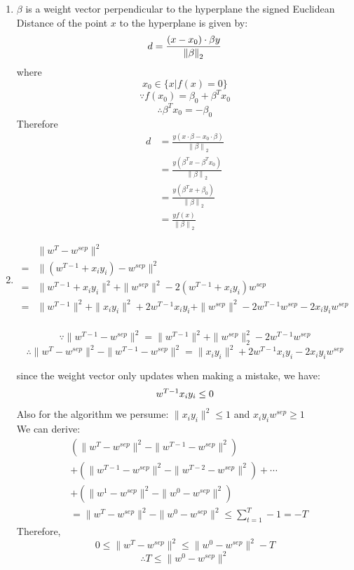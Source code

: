 \documentclass[11pt, oneside]{article}   	%
\begin{document}
\begin{enumerate}
\item %
  $\beta$ is a weight vector perpendicular to the hyperplane
  the signed Euclidean Distance of the point $x$ to the hyperplane is given by:
  \[
  d=\frac{(x-x_0) \cdot \beta y} {\left \| \beta \right \|_2}\\
  \]
  where
  \[
  x_0 \in \{x|f(x)=0\}
  \]
  \[
  \because f(x_0)=\beta_0 + \beta^Tx_0
  \]
  \[
  \therefore \beta^T x_0 = -\beta_0
  \]
  Therefore
  \begin{equation}
    \begin{split}
      d&=\frac{y(x \cdot \beta - x_0 \cdot \beta)} {\left \| \beta \right \|_2}\\
      &=\frac{y(\beta^T x - \beta^T x_0)} {\left \| \beta \right \|_2}\\
      &=\frac{y(\beta^T x + \beta_0)} {\left \| \beta \right \|_2}\\
      &=\frac{yf(x)} {\left \| \beta \right \|_2}
    \end{split}
  \end{equation}

\item %
  \begin{equation}
    \begin{split}
        & \| w^T - w^{sep} \|^2 \\
      = & \| (w^{T-1} + x_i y_i) - w^{sep} \|^2 \\
      = & \| w^{T-1} + x_i y_i \|^2  + \| w^{sep} \|^2 - 2 (w^{T-1} + x_i y_i) w^{sep} \\
      = & \|w^{T-1}\|^2 + \|x_i y_i\|^2 + 2 w^{T-1} x_i y_i + \| w^{sep} \|^2 - 2 w^{T-1} w^{sep} - 2 x_i y_i w^{sep}   \\
    \end{split}
  \end{equation}
  
  \[
  \because
  \| w^{T-1} - w^{sep} \|^2 = \|w^{T-1}\|^2 +  \| w^{sep} \|_2^2 - 2 w^{T-1} w^{sep}
  \]
  \[
  \therefore
  \| w^T - w^{sep} \|^2 - \| w^{T-1} - w^{sep} \|^2 = \|x_i y_i\|^2 + 2 w^{T-1} x_i y_i - 2 x_i y_i w^{sep}
  \]

since the weight vector only updates when making a mistake, we have:
\[
w^{T-1} x_i y_i \leq 0 \\
\]
Also for the algorithm we persume:
$ \|x_i y_i\|^2 \leq 1 $ and $ x_i y_i w^{sep} \geq 1 $\\
We can derive:
\begin{equation}
  \begin{split}
   & (\| w^T - w^{sep} \|^2 - \| w^{T-1} - w^{sep} \|^2) \\
    &+ (\| w^{T-1} - w^{sep} \|^2 - \| w^{T-2} - w^{sep} \|^2) + \cdots \\
    &+  (\| w^1 - w^{sep} \|^2 - \| w^0 - w^{sep} \|^2) \\
    &= \| w^T - w^{sep} \|^2 - \| w^0 - w^{sep} \|^2
    \leq \sum_{t=1}^{T}-1 = -T
  \end{split}
\end{equation}
Therefore,
\[
0 \leq \| w^T - w^{sep} \|^2 \leq \| w^0 - w^{sep} \|^2 - T 
\]
\[
\therefore T \leq \| w^0 - w^{sep} \|^2 
\]

\end{enumerate}
\end{document}
